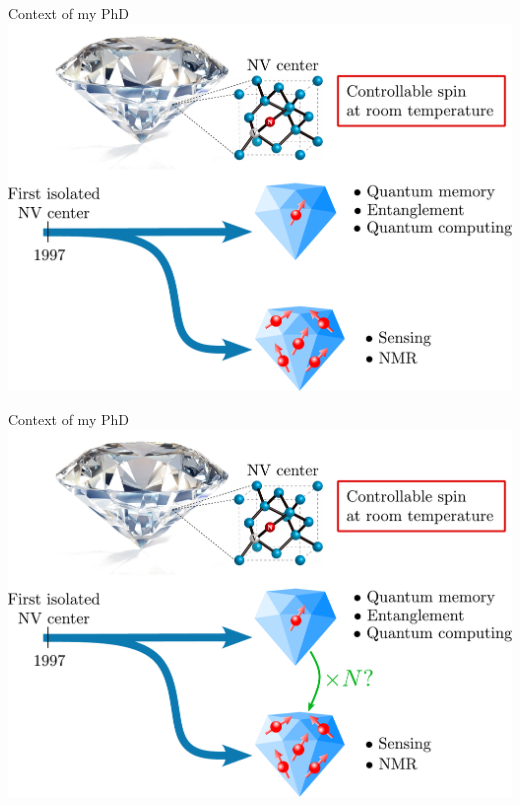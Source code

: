 \documentclass{beamer}
\begin{document}
\begin{frame}{Context of my PhD}
\centering
\includegraphics[width=\textwidth,height=0.85\textheight,keepaspectratio]{Slide_contexte_f-2}
\end{frame}

\begin{frame}{Context of my PhD}
\centering
\includegraphics[width=\textwidth,height=0.85\textheight,keepaspectratio]{Slide_contexte_f-1}
\end{frame}
\end{document}
